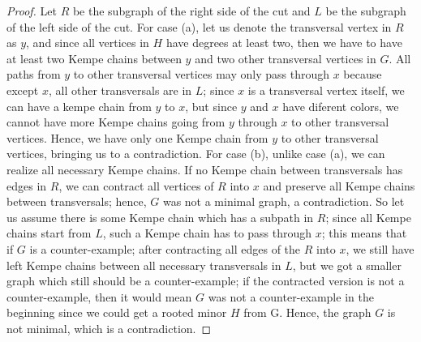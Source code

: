 \begin{proof}
    Let $R$ be the subgraph of the right side of the cut and $L$ be the subgraph of the left side of the cut.
    For case (a), let us denote the transversal vertex in $R$ as $y$, and since 
    all vertices in $H$ have degrees at least two, then we have to have at least two Kempe chains between $y$ and two other transversal vertices in $G$. All paths from $y$ to other transversal vertices may only pass through
    $x$ because except $x$, all other transversals are in $L$; since $x$ is a transversal vertex itself, we can have a kempe chain from $y$ to $x$, but since $y$ and $x$ have diferent
    colors, we cannot have more Kempe chains going from $y$ through $x$ to other transversal vertices. Hence, we have only one Kempe chain from $y$ to other transversal vertices, bringing us to a contradiction.
    For case (b), unlike case (a), we can realize all necessary Kempe chains. If no Kempe chain between transversals has edges in $R$, we can contract
    all vertices of $R$ into $x$ and preserve all Kempe chains between transversals; hence, $G$ was not a minimal graph, a contradiction.
    So let us assume there is some Kempe chain which has a subpath in $R$; since all Kempe chains start from $L$, such a Kempe chain has to pass through $x$; this means that if 
    $G$ is a counter-example; after contracting all edges of the $R$ into $x$, we still have left Kempe chains between all necessary transversals in $L$, but we got a smaller graph
    which still should be a counter-example; if the contracted version is not a counter-example, then it would mean $G$ was not a counter-example in the beginning since we could get a 
    rooted minor $H$ from G. Hence, the graph $G$ is not minimal, which is a contradiction.


\end{proof}
